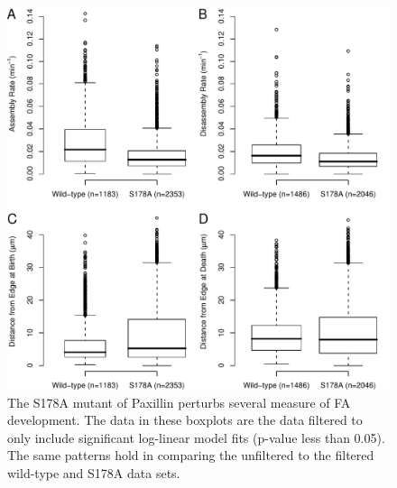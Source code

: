 \documentclass[letterpaper]{article}
\begin{document}
\begin{figure}[htbp]
\begin{center}
\includegraphics{../figures/supplemental/unfilt_S178A_vs_wild-type}
\caption{The S178A mutant of Paxillin perturbs several measure of FA
development. The data in these boxplots are the data filtered to only include
significant log-linear model fits (p-value less than 0.05). The same patterns
hold in comparing the unfiltered to the filtered wild-type and S178A data sets.}
\label{default}
\end{center}
\end{figure}
\end{document}
